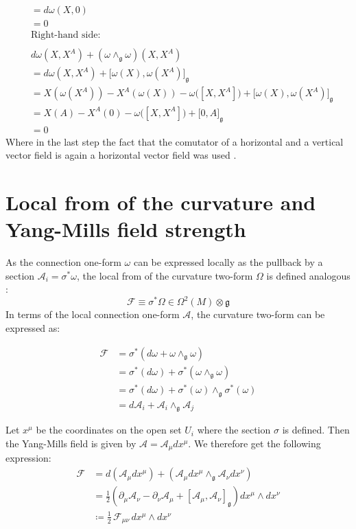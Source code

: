 \begin{align*}
  &= d\omega(X, 0) \\
  &= 0 \\
    &\text{Right-hand side:} \\
    \\
  &d\omega(X,X^A) + (\omega \wedge_{\mathfrak{g}} \omega)(X,X^A) \\
  &= d\omega(X, X^A) + \big[ \omega(X), \omega(X^A) \big]_\mathfrak{g} \\
  &= X(\omega(X^A)) - X^A(\omega(X)) - \omega\big( [X,X^A] \big) + \big[ \omega(X), \omega(X^A) \big]_\mathfrak{g} \\
  &= X(A) - X^A(0) - \omega\big( [X,X^A] \big) + \big[ 0, A \big]_\mathfrak{g} \\
  &= 0
\end{align*}
Where in the last step the fact that the comutator of a horizontal and a vertical vector field is again a horizontal vector field was used \cite{NakaharaGeometrytopologyphysics2005}.


\section{Local from of the curvature and Yang-Mills field strength}

As the connection one-form $\omega$ can be expressed locally as the pullback by a section $\mathcal{A}_i = \sigma^*\omega$, the local from of the curvature two-form $\Omega$ is defined analogous \cite{NakaharaGeometrytopologyphysics2005}:
\[ \mathscr{F} \equiv \sigma^*\Omega \in \Omega^2(M)\otimes\mathfrak{g} \]
In terms of the local connection one-form $\mathcal{A}$, the curvature two-form can be expressed as:

\begin{align*}
  \mathscr{F} &= \sigma^*(d\omega + \omega \wedge_\mathfrak{g} \omega) \\
  &= \sigma^*(d\omega) + \sigma^*(\omega \wedge_\mathfrak{g} \omega) \\
  &= \sigma^*(d\omega) + \sigma^*(\omega) \wedge_\mathfrak{g} \sigma^*(\omega) \\
  &= d\mathcal{A}_i + \mathcal{A}_i \wedge_\mathfrak{g} \mathcal{A}_j
\end{align*}

Let $x^\mu$ be the coordinates on the open set $U_i$ where the section $\sigma$ is defined. Then the Yang-Mills field is given by $\mathcal{A}=\mathcal{A}_\mu dx^\mu$. We therefore get the following expression:
\begin{align*}
  \mathscr{F} &= d(\mathcal{A}_\mu dx^\mu) + (\mathcal{A}_\mu dx^\mu \wedge_\mathfrak{g} \mathcal{A}_\nu dx^\nu) \\
  &= \frac12 \left( \partial_\mu \mathcal{A}_\nu - \partial_\nu \mathcal{A}_\mu + [\mathcal{A}_\mu, \mathcal{A}_\nu]_\mathfrak{g} \right) dx^\mu \wedge dx^\nu \\
  &\coloneq \frac12 \, \mathscr{F}_{\mu\nu} \, dx^\mu \wedge dx^\nu
\end{align*}

